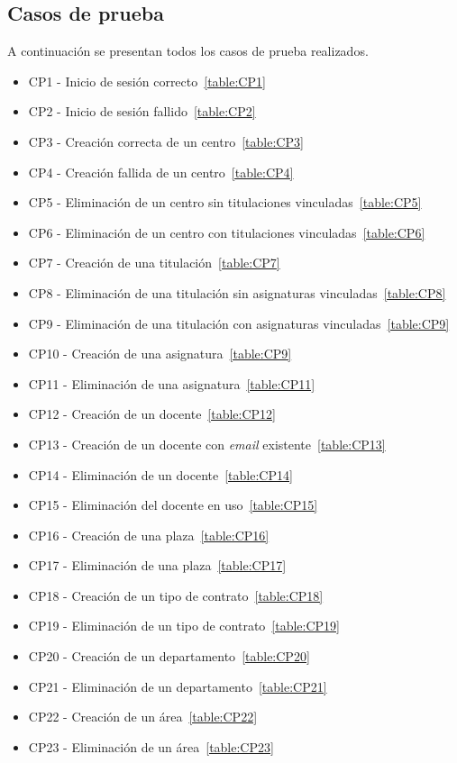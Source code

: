 \subsection{Casos de prueba}
A continuación se presentan todos los casos de prueba realizados.
\begin{itemize}
\item CP1 - Inicio de sesión correcto~\ref{table:CP1}
\item CP2 - Inicio de sesión fallido~\ref{table:CP2}
\item CP3 - Creación correcta de un centro~\ref{table:CP3}
\item CP4 - Creación fallida de un centro~\ref{table:CP4}
\item CP5 - Eliminación de un centro sin titulaciones vinculadas~\ref{table:CP5}
\item CP6 - Eliminación de un centro con titulaciones vinculadas~\ref{table:CP6}
\item CP7 - Creación de una titulación~\ref{table:CP7}
\item CP8 - Eliminación de una titulación sin asignaturas vinculadas~\ref{table:CP8}
\item CP9 - Eliminación de una titulación con asignaturas vinculadas~\ref{table:CP9}
\item CP10 - Creación de una asignatura~\ref{table:CP9}
\item CP11 - Eliminación de una asignatura~\ref{table:CP11}
\item CP12 - Creación de un docente~\ref{table:CP12}
\item CP13 - Creación de un docente con \textit{email} existente~\ref{table:CP13}
\item CP14 - Eliminación de un docente~\ref{table:CP14}
\item CP15 - Eliminación del docente en uso~\ref{table:CP15}
\item CP16 - Creación de una plaza~\ref{table:CP16}
\item CP17 - Eliminación de una plaza~\ref{table:CP17}
\item CP18 - Creación de un tipo de contrato~\ref{table:CP18}
\item CP19 - Eliminación de un tipo de contrato~\ref{table:CP19}
\item CP20 - Creación de un departamento~\ref{table:CP20}
\item CP21 - Eliminación de un departamento~\ref{table:CP21}
\item CP22 - Creación de un área~\ref{table:CP22}
\item CP23 - Eliminación de un área~\ref{table:CP23}

\end{itemize}
